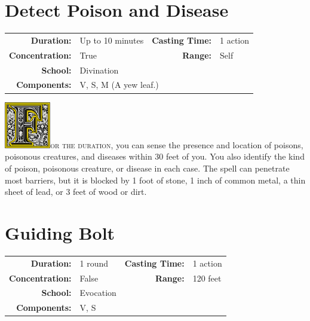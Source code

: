 \documentclass[12pt,showtrims]{memoir}
\begin{document}
\section*{Detect Poison and Disease}

{
\small\centering\vspace{-6pt}
\begin{tabular}{rlrl}
\toprule

\textbf{Duration:} & Up to 10 minutes &
\textbf{Casting Time:} & 1 action \\
\textbf{Concentration:} & True &
\textbf{Range:} & Self \\
\textbf{School:} & Divination \\
\textbf{Components:} & \multicolumn{3}{p{0.7\textwidth}}{V, S, M (A yew leaf.)}\\

\bottomrule
\end{tabular}
}

\vspace{1\baselineskip}\noindent
\lettrine[lines=4]{\includegraphics[height=58pt]{initials/F.png}}{or the duration}, you can sense the presence and location of poisons, poisonous creatures, and diseases within 30 feet of you. You also identify the kind of poison, poisonous creature, or disease in each case. The spell can penetrate most barriers, but it is blocked by 1 foot of stone, 1 inch of common metal, a thin sheet of lead, or 3 feet of wood or dirt.

\newpage
\section*{Guiding Bolt}

{
\small\centering\vspace{-6pt}
\begin{tabular}{rlrl}
\toprule

\textbf{Duration:} & 1 round &
\textbf{Casting Time:} & 1 action \\
\textbf{Concentration:} & False &
\textbf{Range:} & 120 feet \\
\textbf{School:} & Evocation \\
\textbf{Components:} & \multicolumn{3}{p{0.7\textwidth}}{V, S}\\

\bottomrule
\end{tabular}
}
\end{document}
